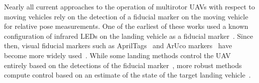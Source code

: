 Nearly all current approaches to the operation of multirotor UAVs with respect to moving
vehicles rely on the
detection of a fiducial marker on the moving vehicle for relative pose
measurements. One of the earliest of these works
used a known configuration of infrared LEDs on the landing vehicle as a fiducial
marker~\cite{wenzel2011automatic}.
Since then, visual fiducial markers such as
AprilTags~\cite{olson2011tags} and ArUco markers~\cite{garrido2016generation}
have become more widely
used~\cite{ling2014precision,borowczyk2017autonomous,marantos2018vision,
araar2017vision}.
While some landing methods control the UAV entirely based on the detections of the
fiducial marker~\cite{lee2012autonomous,wynn2019visual}, more robust methods
compute control based on an estimate of the state of the target landing
vehicle~\cite{ling2014precision}.

